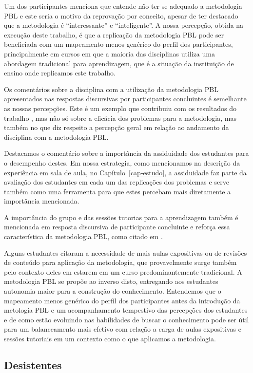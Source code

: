 Um dos participantes menciona que entende não ter se adequado
a metodologia PBL e este seria o motivo da reprovação por conceito,
apesar de ter destacado que a metodologia é ``interessante'' e ``inteligente''.
A nossa percepção, obtida na execução deste trabalho, é que a replicação
da metodologia PBL pode ser beneficiada com um mapeamento menos genérico
do perfil dos participantes, principalmente em cursos em que a maioria
das disciplinas utiliza uma abordagem tradicional para aprendizagem, que
é a situação da instituição de ensino onde replicamos este trabalho.

Os comentários sobre a disciplina com a utilização da metodologia PBL
apresentados nas respostas discursivas por participantes concluintes
é semelhante as nossas percepções.
Este é um exemplo que contribuiu com os resultados
do trabalho \cite{sockalingam2011student}, mas não só sobre a eficácia
dos problemas para a metodologia, mas também no que diz respeito
a percepção geral em relação ao andamento da disciplina
com a metodologia PBL.

Destacamos o comentário sobre a importância da assiduidade dos
estudantes para o desempenho destes.
Em nossa estrategia, como mencionamos na descrição da experiência
em sala de aula, no Capítulo~\ref{cap-estudo}, a assiduidade faz
parte da avaliação dos estudantes em cada um das replicações dos
problemas e serve também como uma ferramenta para que estes
percebam mais diretamente a importância mencionada.

A importância do grupo e das sessões tutorias para a aprendizagem
também é mencionada em resposta discursiva de participante concluinte
e reforça essa característica da metodologia PBL, como citado
em \cite{van2000motivation}.

Alguns estudantes citaram a necessidade de mais aulas
expositivas ou de revisões de conteúdo para aplicação
da metodologia, que provavelmente surge também pelo
contexto deles em estarem em um curso
predominantemente tradicional.
A metodologia PBL se propõe ao inverso disto, entregando
aos estudantes autonomia maior para a construção
do conhecimento.
Entendemos que o mapeamento menos genérico do perfil
dos participantes antes da introdução da metologia PBL
e um acompanhamento tempestivo das percepções dos estudantes
e de como estão evoluindo nas habilidades de buscar o conhecimento
pode ser útil para um balanceamento mais efetivo com
relação a carga de aulas expositivas e sessões tutoriais
em um contexto como o que aplicamos a metodologia.

\subsection{Desistentes}
